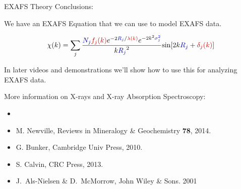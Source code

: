 \begin{slide}{EXAFS Theory  Conclusions:}
  
  \begin{cenpage}{110mm}
    We have an EXAFS Equation that we can use to model EXAFS data.

  \begin{center}
    \[ \chi(k) = \sum_j {\frac{{\Blue{N_j}} {\Red{f_j(k)}}
        e^{-2{\Blue{R_j}}/{\Red{\lambda(k)}}}
        e^{-2k^2{\Blue{\sigma_j^2}}}}{k{\Blue{R_j}}^2}
      {\sin[{2k{\Blue{R_j}} + {\Red{\delta_j(k)}}] }}} \]
  \end{center}

  \vmm
  In later videos and demonstrations we'll show how to use this for
  analyzing EXAFS data.

  

  \vmm\vmm
  
  More information on X-rays and X-ray Absorption Spectroscopy:

  \begin{itemize}
  \item[] {}
  \item[] {} M. Newville, Reviews in  Mineralogy \& Geochemistry {\bf{78}}, 2014.
  \item[] {} G. Bunker, Cambridge Univ  Press,  2010.
  \item[] {} S. Calvin, CRC Press, 2013.
  \item[]  {}  J.~Als-Nielsen
    \& D.~McMorrow,  John Wiley \& Sons. 2001
    
  \end{itemize}

\end{cenpage}


 \vfill
\end{slide}
 

